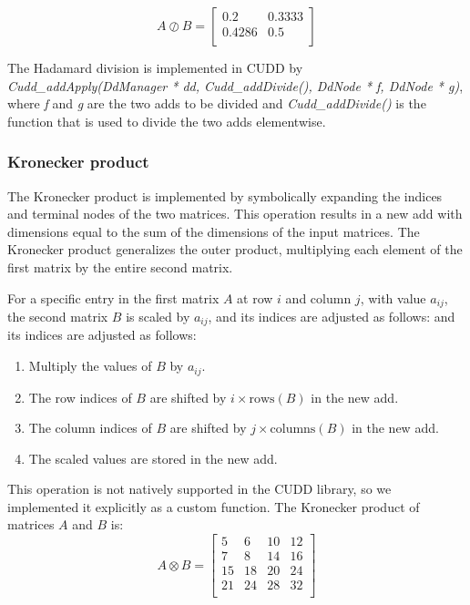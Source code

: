 \[
    A \oslash B = \begin{bmatrix}
        0.2    & 0.3333 \\
        0.4286 & 0.5    \\
    \end{bmatrix}
\]

The Hadamard division is implemented in CUDD by \textit{Cudd\_addApply(DdManager * dd, Cudd\_addDivide(), DdNode * f, DdNode * g)}, where \textit{f} and \textit{g} are the two \glspl{add} to be divided and \textit{Cudd\_addDivide()} is the function that is used to divide the two \glspl{add} elementwise.

\subsubsection{Kronecker product}
The Kronecker product is implemented by symbolically expanding the indices and terminal nodes of the two matrices.
This operation results in a new \gls{add} with dimensions equal to the sum of the dimensions of the input matrices. 
The Kronecker product generalizes the outer product, multiplying each element of the first matrix by the entire second matrix.

For a specific entry in the first matrix $A$ at row $i$ and column $j$, with value $a_{ij}$, the second matrix $B$ is scaled by $a_{ij}$, and its indices are adjusted as follows:
and its indices are adjusted as follows:
\begin{enumerate}
\item Multiply the values of $B$ by $a_{ij}$.
\item The row indices of $B$ are shifted by $i \times \text{rows}(B)$ in the new \gls{add}.
\item The column indices of $B$ are shifted by $j \times \text{columns}(B)$ in the new \gls{add}.
\item The scaled values are stored in the new \gls{add}.
\end{enumerate}

This operation is not natively supported in the CUDD library, so we implemented it explicitly as a custom function. 
The Kronecker product of matrices $A$ and $B$ is:
\[
    A \otimes B = \begin{bmatrix}
        5  & 6  & 10 & 12 \\
        7  & 8  & 14 & 16 \\
        15 & 18 & 20 & 24 \\
        21 & 24 & 28 & 32 \\
    \end{bmatrix}
\]

